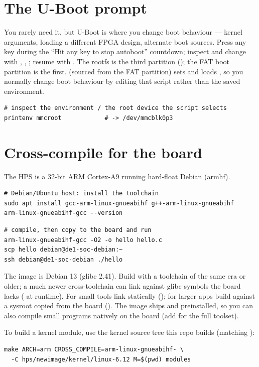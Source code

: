 \section{The U-Boot prompt}
You rarely need it, but U-Boot is where you change boot behaviour --- kernel
arguments, loading a different FPGA design, alternate boot sources. Press any key
during the ``Hit any key to stop autoboot'' countdown; inspect and change with
, , ; resume with .
The rootfs is the third partition (); the FAT boot partition
is the first.  (sourced from the FAT partition) sets
 and loads , so you normally change boot
behaviour by editing that script rather than the saved environment.
\begin{lstlisting}
# inspect the environment / the root device the script selects
printenv mmcroot            # -> /dev/mmcblk0p3
\end{lstlisting}

\section{Cross-compile for the board}
The HPS is a 32-bit ARM Cortex-A9 running hard-float Debian (armhf).
\begin{lstlisting}
# Debian/Ubuntu host: install the toolchain
sudo apt install gcc-arm-linux-gnueabihf g++-arm-linux-gnueabihf
arm-linux-gnueabihf-gcc --version
\end{lstlisting}
\begin{lstlisting}
# compile, then copy to the board and run
arm-linux-gnueabihf-gcc -O2 -o hello hello.c
scp hello debian@de1-soc-debian:~
ssh debian@de1-soc-debian ./hello
\end{lstlisting}
\begin{note}
The image is Debian 13 (glibc 2.41). Build with a toolchain of the same era or
older; a much newer cross-toolchain can link against glibc symbols the board lacks
( at runtime). For small tools link
statically (); for larger apps build against a sysroot copied from
the board (). The image ships  and 
preinstalled, so you can also compile small programs natively on the board
(add  for the full toolset).
\end{note}
To build a kernel module, use the kernel source tree this repo builds (matching
):
\begin{lstlisting}
make ARCH=arm CROSS_COMPILE=arm-linux-gnueabihf- \
  -C hps/newimage/kernel/linux-6.12 M=$(pwd) modules
\end{lstlisting}

